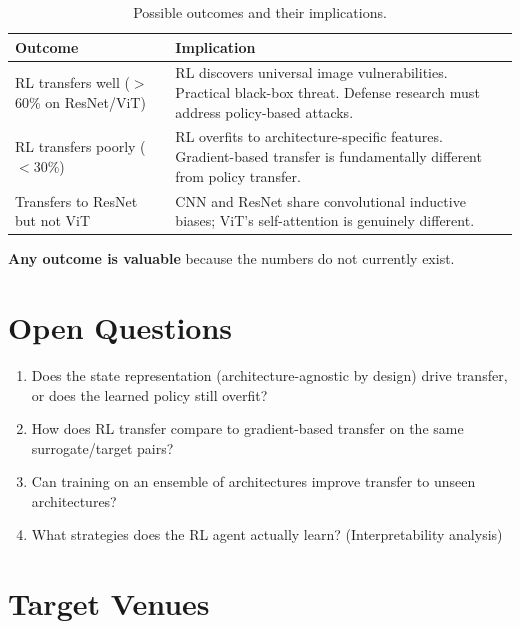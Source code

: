 \documentclass[11pt,a4paper]{article}
\begin{document}
\begin{table}[H]
\centering
\begin{tabular}{@{}p{4.2cm}p{8.5cm}@{}}
\toprule
\textbf{Outcome} & \textbf{Implication} \\
\midrule
RL transfers well ($>$60\% on ResNet/ViT) & RL discovers universal image vulnerabilities. Practical black-box threat. Defense research must address policy-based attacks. \\
\midrule
RL transfers poorly ($<$30\%) & RL overfits to architecture-specific features. Gradient-based transfer is fundamentally different from policy transfer. \\
\midrule
Transfers to ResNet but not ViT & CNN and ResNet share convolutional inductive biases; ViT's self-attention is genuinely different. \\
\bottomrule
\end{tabular}
\caption{Possible outcomes and their implications.}
\end{table}

\textbf{Any outcome is valuable} because the numbers do not currently exist.

\section{Open Questions}

\begin{enumerate}
    \item Does the state representation (architecture-agnostic by design) drive transfer, or does the learned policy still overfit?
    \item How does RL transfer compare to gradient-based transfer on the same surrogate/target pairs?
    \item Can training on an ensemble of architectures improve transfer to unseen architectures?
    \item What strategies does the RL agent actually learn? (Interpretability analysis)
\end{enumerate}

\section{Target Venues}
\end{document}
